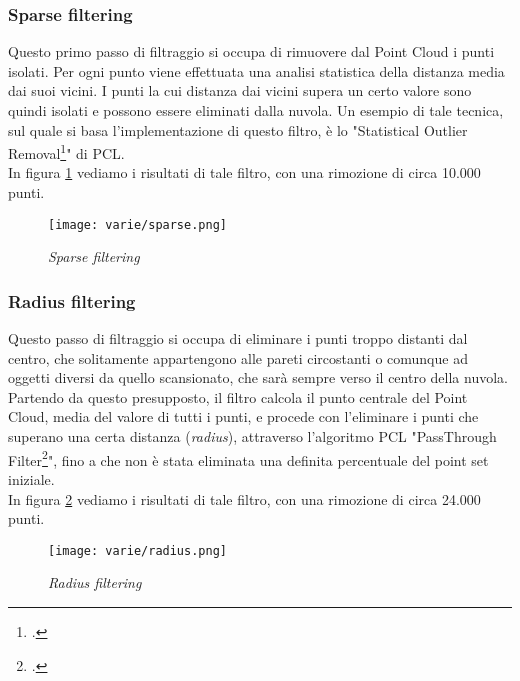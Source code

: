 \subsubsection{Sparse filtering}
Questo primo passo di filtraggio si occupa di rimuovere dal Point Cloud i punti isolati. Per ogni punto viene effettuata una analisi statistica della distanza media dai suoi vicini. I punti la cui distanza dai vicini supera un certo valore sono quindi isolati e possono essere eliminati dalla nuvola.
Un esempio di tale tecnica, sul quale si basa l'implementazione di questo filtro, è lo "Statistical Outlier Removal\footcite{http://pointclouds.org/documentation/tutorials/statistical_outlier.php/statistical-outlier-removal}" di PCL.\\
In figura \ref{fig:sparse} vediamo i risultati di tale filtro, con una rimozione di circa 10.000 punti.
\begin{figure}[!h] 
    \centering 
    \texttt{[image: varie/sparse.png]} 
    \caption{\emph{Sparse filtering}}
    \label{fig:sparse}
\end{figure}
\subsubsection{Radius filtering}
Questo passo di filtraggio si occupa di eliminare i punti troppo distanti dal centro, che solitamente appartengono alle pareti circostanti o comunque ad oggetti diversi da quello scansionato, che sarà sempre verso il centro della nuvola.\\
Partendo da questo presupposto, il filtro calcola il punto centrale del Point Cloud, media del valore di tutti i punti, e procede con l'eliminare i punti che superano una certa distanza (\emph{radius}), attraverso l'algoritmo PCL "PassThrough Filter\footcite{http://pointclouds.org/documentation/tutorials/passthrough.php/passthrough}", fino a che non è stata eliminata una definita percentuale del point set iniziale.\\
In figura \ref{fig:radius} vediamo i risultati di tale filtro, con una rimozione di circa 24.000 punti.
\begin{figure}[!h] 
    \centering 
    \texttt{[image: varie/radius.png]} 
    \caption{\emph{Radius filtering}}
    \label{fig:radius}
\end{figure}
